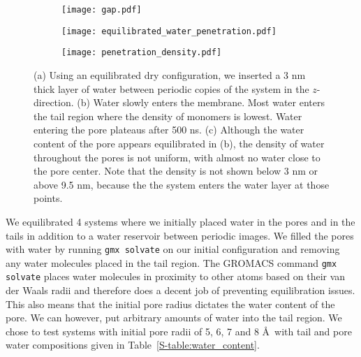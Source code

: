   \begin{figure}[!htb]
  \centering
  \begin{subfigure}{0.18\textwidth}
  \texttt{[image: gap.pdf]}
  \caption{}\label{S-fig:gap}
  \end{subfigure}  
  \begin{subfigure}{0.37\textwidth}
  \texttt{[image: equilibrated\_water\_penetration.pdf]}
  \caption{}\label{S-fig:equilibrated_water_penetration}
  \end{subfigure}  
  \begin{subfigure}{0.37\textwidth}
  \texttt{[image: penetration\_density.pdf]}
  \caption{}\label{S-fig:penetration_density}
  \end{subfigure}  
  \caption{(a) Using an equilibrated dry configuration, we inserted a 3 nm thick layer 
  of water between periodic copies of the system in the $z$-direction. (b) Water slowly
  enters the membrane. Most water enters the tail region where the density of monomers
  is lowest. Water entering the pore plateaus after 500 ns. (c) Although the water
  content of the pore appears equilibrated in (b), the density of water throughout
  the pores is not uniform, with almost no water close to the pore center. Note that
  the density is not shown below 3 nm or above 9.5 nm, because the the system
  enters the water layer at those points.
  }\label{S-fig:gap_solvation}
  \end{figure}

  We equilibrated 4 systems where we initially placed water in the pores and in
  the tails in addition to a water reservoir between periodic images. We filled
  the pores with water by running \texttt{gmx solvate} on our initial
  configuration and removing any water molecules placed in the tail region. The
  GROMACS command \texttt{gmx solvate} places water molecules in proximity to
  other atoms based on their van der Waals radii and therefore does
  a decent job of preventing equilibration issues. This also means that the
  initial pore radius dictates the water content of the pore. We can however, put
  arbitrary amounts of water into the tail region. We chose to test systems with
  initial pore radii of 5, 6, 7 and 8 \AA~with tail and pore water compositions
  given in Table~\ref{S-table:water_content}.

